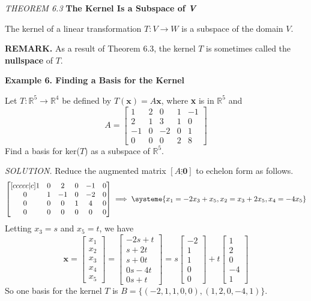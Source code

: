 \documentclass{article}
\newcommand\R{\mathbb{R}}
\begin{document}
    \begin{tcolorbox}[colback = {blue9}]
        \textit{THEOREM 6.3} \textbf{The Kernel Is a Subspace of \textit{V}}

        The kernel of a linear transformation $T: V \to W$ is a subspace of the domain $V$.
    \end{tcolorbox}
    \textbf{REMARK.} As a result of Theorem 6.3, the kernel $T$ is sometimes called the \textbf{nullspace} of $T$.

    \textbf{Example 6. \textcolor{blue5}{Finding a Basis for the Kernel}}

    Let $T: \R^5  \to \R^4 $ be defined by $T( \textbf{x} ) = A \textbf{x}$, where \textbf{x} is in $ \R^5 $ and
    \[A = \begin{bmatrix}
        1 & 2 & 0 & 1 & -1\\
        2 & 1 & 3 & 1 & 0 \\
        -1 & 0 & -2 & 0 & 1\\
        0 & 0 & 0 & 2 & 8
    \end{bmatrix}\]
    Find a basis for ker($T$) as a subspace of $ \R^5 $.

    \textit{\textcolor{blue5}{SOLUTION.}} Reduce the augmented matrix $[A \vdots \textbf{0}]$ to echelon form as follows.
    \[ \begin{bmatrix}[ccccc|c]
        1 & 0 & 2 & 0 & -1 & 0 \\
        0 & 1 & -1 & 0 & -2 & 0\\
        0 & 0 & 0 & 1 & 4 & 0 \\
        0 & 0 & 0 & 0 & 0 & 0
    \end{bmatrix} \implies 
    \systeme{
        x_1 = -2x_3 + x_5,
        x_2 = x_3 + 2x_5,
        x_4 = -4x_5
    }\]
    Letting $x_3 = s$ and $x_5 = t$, we have
    \[ \textbf{x} = \begin{bmatrix}
        x_1 \\ x_2 \\ x_3 \\ x_4 \\ x_5
    \end{bmatrix} = \begin{bmatrix}
        -2s + t \\
        s + 2t \\
        s + 0t \\
        0s - 4t \\
        0s +t
    \end{bmatrix} = s \begin{bmatrix}
    -2 \\ 1 \\ 1 \\ 0 \\ 0
    \end{bmatrix} + t \begin{bmatrix}
        1 \\ 2 \\ 0 \\ -4 \\ 1
    \end{bmatrix} \]
    So one basis for the kernel $T$ is $B = \{(-2, 1, 1, 0, 0), (1, 2, 0, -4, 1)\}$.
\end{document}
